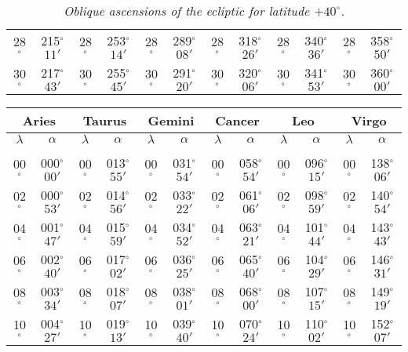 \begin{table}
{\begin{tabular}{cc|cc|cc|cc|cc|cc}
28$^\circ$ & 215$^\circ$$11'$ & 28$^\circ$ & 253$^\circ$$14'$ & 28$^\circ$ & 289$^\circ$$08'$ & 28$^\circ$ & 318$^\circ$$26'$ &  28$^\circ$ & 340$^\circ$$36'$ & 28$^\circ$ & 358$^\circ$$50'$\\
30$^\circ$ & 217$^\circ$$43'$ & 30$^\circ$ & 255$^\circ$$45'$ & 30$^\circ$ & 291$^\circ$$20'$ & 30$^\circ$ & 320$^\circ$$06'$ &  30$^\circ$ & 341$^\circ$$53'$ & 30$^\circ$ & 360$^\circ$$00'$\\
\end{tabular}}
\caption{\em Oblique ascensions of the ecliptic for latitude $+40^\circ$.}
\end{table}


\begin{table}
\centering
{\small \begin{tabular}{cc|cc|cc|cc|cc|cc}
\multicolumn{2}{c}{Aries}\vline & \multicolumn{2}{c}{Taurus} \vline& \multicolumn{2}{c}{Gemini} \vline& \multicolumn{2}{c}{Cancer}\vline &
\multicolumn{2}{c}{Leo}\vline & \multicolumn{2}{c}{Virgo}\\\hline
$\lambda$& $\alpha$& $\lambda$& $\alpha$& $\lambda$& $\alpha$& $\lambda$& $\alpha$& $\lambda$& $\alpha$& $\lambda$& $\alpha$\\\hline
&&&&&&&&&&&\\[-2ex]
00$^\circ$ & 000$^\circ$$00'$ & 00$^\circ$ & 013$^\circ$$55'$ & 00$^\circ$ & 031$^\circ$$54'$ & 00$^\circ$ & 058$^\circ$$54'$ & 00$^\circ$ & 096$^\circ$$15'$ & 00$^\circ$ & 138$^\circ$$06'$\\
02$^\circ$ & 000$^\circ$$53'$ & 02$^\circ$ & 014$^\circ$$56'$ & 02$^\circ$ & 033$^\circ$$22'$ & 02$^\circ$ & 061$^\circ$$06'$ & 02$^\circ$ & 098$^\circ$$59'$ & 02$^\circ$ & 140$^\circ$$54'$\\
04$^\circ$ & 001$^\circ$$47'$ & 04$^\circ$ & 015$^\circ$$59'$ & 04$^\circ$ & 034$^\circ$$52'$ & 04$^\circ$ & 063$^\circ$$21'$ & 04$^\circ$ & 101$^\circ$$44'$ & 04$^\circ$ & 143$^\circ$$43'$\\
06$^\circ$ & 002$^\circ$$40'$ & 06$^\circ$ & 017$^\circ$$02'$ & 06$^\circ$ & 036$^\circ$$25'$ & 06$^\circ$ & 065$^\circ$$40'$ & 06$^\circ$ & 104$^\circ$$29'$ & 06$^\circ$ & 146$^\circ$$31'$\\
08$^\circ$ & 003$^\circ$$34'$ & 08$^\circ$ & 018$^\circ$$07'$ & 08$^\circ$ & 038$^\circ$$01'$ & 08$^\circ$ & 068$^\circ$$00'$ & 08$^\circ$ & 107$^\circ$$15'$ & 08$^\circ$ & 149$^\circ$$19'$\\
10$^\circ$ & 004$^\circ$$27'$ & 10$^\circ$ & 019$^\circ$$13'$ & 10$^\circ$ & 039$^\circ$$40'$ & 10$^\circ$ & 070$^\circ$$24'$ & 10$^\circ$ & 110$^\circ$$02'$ & 10$^\circ$ & 152$^\circ$$07'$\\

\end{tabular}}
\end{table}
